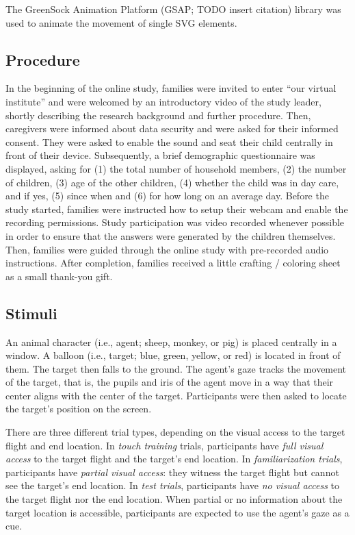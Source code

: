 \documentclass[
  english,
  man,floatsintext]{apa6}
\begin{document}
The GreenSock Animation Platform (GSAP; TODO insert citation) library was used to animate the movement of single SVG elements.

\hypertarget{procedure}{%
\subsection{Procedure}\label{procedure}}

In the beginning of the online study, families were invited to enter ``our virtual institute'' and were welcomed by an introductory video of the study leader, shortly describing the research background and further procedure. Then, caregivers were informed about data security and were asked for their informed consent. They were asked to enable the sound and seat their child centrally in front of their device. Subsequently, a brief demographic questionnaire was displayed, asking for (1) the total number of household members, (2) the number of children, (3) age of the other children, (4) whether the child was in day care, and if yes, (5) since when and (6) for how long on an average day. Before the study started, families were instructed how to setup their webcam and enable the recording permissions. Study participation was video recorded whenever possible in order to ensure that the answers were generated by the children themselves.
Then, families were guided through the online study with pre-recorded audio instructions. After completion, families received a little crafting / coloring sheet as a small thank-you gift.

\hypertarget{stimuli}{%
\subsection{Stimuli}\label{stimuli}}

An animal character (i.e., agent; sheep, monkey, or pig) is placed centrally in a window. A balloon (i.e., target; blue, green, yellow, or red) is located in front of them. The target then falls to the ground. The agent's gaze tracks the movement of the target, that is, the pupils and iris of the agent move in a way that their center aligns with the center of the target. Participants were then asked to locate the target's position on the screen.

There are three different trial types, depending on the visual access to the target flight and end location. In \emph{touch training} trials, participants have \emph{full visual access} to the target flight and the target's end location. In \emph{familiarization trials}, participants have \emph{partial visual access}: they witness the target flight but cannot see the target's end location. In \emph{test trials}, participants have \emph{no visual access} to the target flight nor the end location. When partial or no information about the target location is accessible, participants are expected to use the agent's gaze as a cue.
\end{document}
